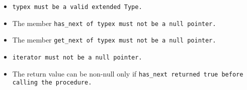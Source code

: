 

\begin{itemize}

\item \tt{typex} must be a valid extended \tt{Type}.

\item The member \tt{has_next} of \tt{typex} must not be a null pointer.

\item The member \tt{get_next} of \tt{typex} must not be a null pointer.

\item \tt{iterator} must not be a null pointer.

\end{itemize}


\begin{itemize}

\item The return value can be non-null only if
\tt{has_next} returned \tt{true} before calling the procedure.

\end{itemize}
